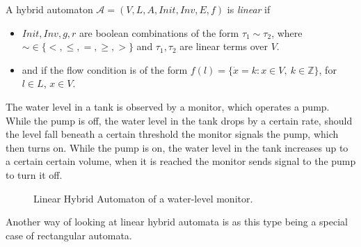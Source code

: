 \begin{defi}
A hybrid automaton $\mathcal{A}=(V,L,A,Init,Inv,E,f)$ is \emph{linear} if
\begin{itemize}
    \item{$Init, Inv, g, r$ are boolean combinations of the form $\tau_{1} \sim \tau_{2}$, where $\sim\in\{<,\leq,=,\geq,>\}$ and $\tau_{1},\tau_{2}$ are linear terms over $V$.}
    \item{and if the flow condition is of the form $f(l)=\{\dot{x}=k : x\in V,\ k\in\mathbb{Z}\}$, for $l\in L$, $x\in V$.}
\end{itemize}
\end{defi}

\begin{ex}
The water level in a tank is observed by a monitor, which operates a pump. While the pump is off, the water level in the tank drops by a certain rate, should the level fall beneath a certain threshold the monitor signals the pump, which then turns on. While the pump is on, the water level in the tank increases up to a certain certain volume, when it is reached the monitor sends signal to the pump to turn it off.
\begin{figure}[H]
    \begin{center}
        \caption{Linear Hybrid Automaton of a water-level monitor.}
        \label{fig:exwaterlevel}
    \end{center}
\end{figure}
\end{ex}
Another way of looking at linear hybrid automata is as this type being a special case of rectangular automata.

